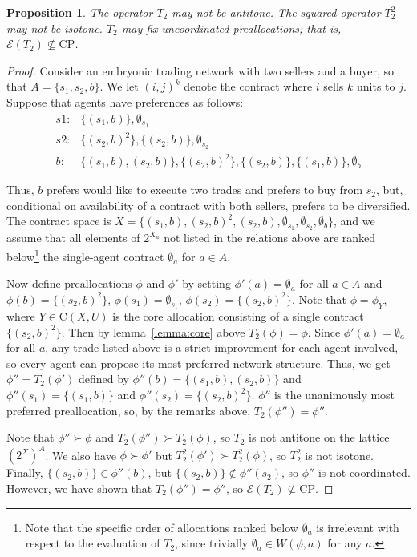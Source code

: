 \documentclass[11pt,reqno]{amsart}
\newtheorem{prop}[thm]{Proposition}
\theoremstyle{definition}
\numberwithin{equation}{section}
\newcommand{\prf}{\begin{proof}}
\newcommand{\eprf}{\end{proof}}
\newcommand{\pre}{\phi}
\newcommand{\coordpre}{\mathrm{CP}}
\newcommand{\prealloc}{(2^X)^A}
\newcommand{\sub}{\subseteq}
\newcommand{\core}{\mathrm{C}(X,U)}
\newcommand{\fix}{\mathcal{E}}
\newcommand{\su}{\succ}
\newcommand{\optwo}{T_2}
\begin{document}
\begin{prop}
The operator $\optwo$ may not be antitone.
The squared operator $\optwo^2$ may not be isotone.
$\optwo$ may fix uncoordinated preallocations; that is, $\fix(\optwo) \not \sub \coordpre$.
\end{prop}
\prf 
Consider an embryonic trading network with two sellers and a buyer, so that $A = \{s_1,s_2,b\}$. 
We let $(i,j)^k$ denote the contract where $i$ sells $k$ units to $j$.
Suppose that agents have preferences as follows:
\begin{align*}
s1:& \{(s_1,b)\}, \emptyset_{s_1} \\
s2:& \{(s_2,b)^2\}, \{(s_2,b)\}, \emptyset_{s_2} \\
b:& \{(s_1,b), (s_2,b) \}, \{(s_2,b)^2\}, \{(s_2,b)\}, \{(s_1,b)\}, \emptyset_b
\end{align*}

Thus, $b$ prefers would like to execute two trades and prefers to buy from $s_2$, but, conditional on availability of a contract with both sellers, prefers to be diversified.
The contract space is $X = \{(s_1,b), (s_2,b)^2, (s_2,b), \emptyset_{s_1}, \emptyset_{s_2}, \emptyset_b\}$, and we assume that all elements of $2^{X_a}$ not listed in the relations above are ranked below\footnote{Note that the specific order of allocations ranked below $\emptyset_a$ is irrelevant with respect to the evaluation of $\optwo$, since trivially $\emptyset_a \in W(\pre,a)$ for any $a$.} the single-agent contract $\emptyset_a$ for $a \in A$.

Now define preallocations $\pre$ and $\pre'$ by setting $\pre'(a) = \emptyset_a$ for all $a \in A$ and $\pre(b) = \{(s_2,b)^2\}$, $\pre(s_1) = \emptyset_{s_1}$, $\pre(s_2) = \{(s_2,b)^2\}$.
Note that $\pre = \pre_Y$, where $Y \in \core$ is the core allocation consisting of a single contract $\{(s_2,b)^2\}$. 
Then by lemma~\ref{lemma:core} above $\optwo(\pre) = \pre$.
Since $\pre'(a) = \emptyset_a$ for all $a$, any trade listed above is a strict improvement for each agent involved, so every agent can propose its most preferred network structure.
Thus, we get $\pre'' = \optwo(\pre')$ defined by $\pre''(b) = \{(s_1,b),(s_2,b)\}$ and $\pre''(s_1) = \{(s_1,b)\}$ and $\pre''(s_2) = \{(s_2,b)^2\}$.
$\pre''$ is the unanimously most preferred preallocation, so, by the remarks above, $\optwo(\pre'') = \pre''$.

Note that $\pre'' \su \pre$ and $\optwo(\pre'') \su \optwo(\pre)$, so $\optwo$ is not antitone on the lattice $\prealloc$.
We also have $\pre \su \pre'$ but $\optwo^2(\pre') \su \optwo^2(\pre)$, so $\optwo^2$ is not isotone.
Finally, $ \{(s_2,b)\} \in \pre''(b)$, but $\{(s_2,b)\} \not \in \pre''(s_2)$, so $\pre''$ is not coordinated.
However, we have shown that $\optwo(\pre'') = \pre''$, so $\fix(\optwo) \not \sub \coordpre$.
\eprf
\end{document}
